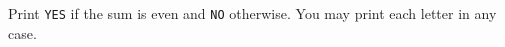 Print \texttt{YES} if the sum is even and \texttt{NO} otherwise. You may print each letter in any case.
